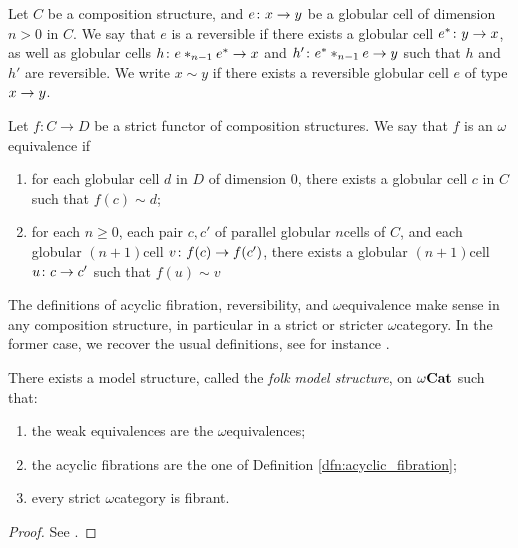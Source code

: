 \begin{dfn} 
    Let \( C \) be a composition structure, and \( e \colon x \to y \) be a globular cell of dimension \( n > 0 \) in \( C \).
    We say that \( e \) is a reversible if there exists a globular cell \( e^* \colon y \to x \), as well as globular cells \( h \colon e *_{n - 1} e^* \to x \) and \( h' \colon e^* *_{n - 1} e \to y \) such that \( h \) and \( h' \) are reversible.
    We write \( x \sim y \) if there exists a reversible globular cell \( e \) of type \( x \to y \).
\end{dfn}

\begin{dfn} 
    Let \( f \colon C \to D \) be a strict functor of composition structures.
    We say that \( f \) is an \( \omega \)\nbd equivalence if
    \begin{enumerate}
        \item for each globular cell \( d \) in \( D \) of dimension \( 0 \), there exists a globular cell \( c \) in \( C \) such that \( f(c) \sim d \);
        \item for each \( n \geq 0 \), each pair \( c, c' \) of parallel globular \( n \)\nbd cells of \( C \), and each globular \( (n + 1) \)\nbd cell \( v \colon f(c) \to f(c') \), there exists a globular \( (n + 1) \)\nbd cell \( u \colon c \to c' \) such that \( f(u) \sim v \)
    \end{enumerate}
\end{dfn}

\begin{comm}
    The definitions of acyclic fibration, reversibility, and \( \omega \)\nbd equivalence make sense in any composition structure, in particular in a strict or stricter \( \omega \)\nbd category.
    In the former case, we recover the usual definitions, see for instance \cite[19.2.3, 20.1.1, 20.1.11]{ara2025polygraphs}.
\end{comm}

\begin{thm} \label{thm:folk_model_structure}
    There exists a model structure, called the \emph{folk model structure}, on \( {\omega\mathbf{Cat}} \) such that:
    \begin{enumerate}
        \item the weak equivalences are the \( \omega \)\nbd equivalences;
        \item the acyclic fibrations are the one of Definition \ref{dfn:acyclic_fibration};
        \item every strict \( \omega \)\nbd category is fibrant. 
    \end{enumerate} 
\end{thm}
\begin{proof}
    See \cite{lafont2010folk}.
\end{proof}

